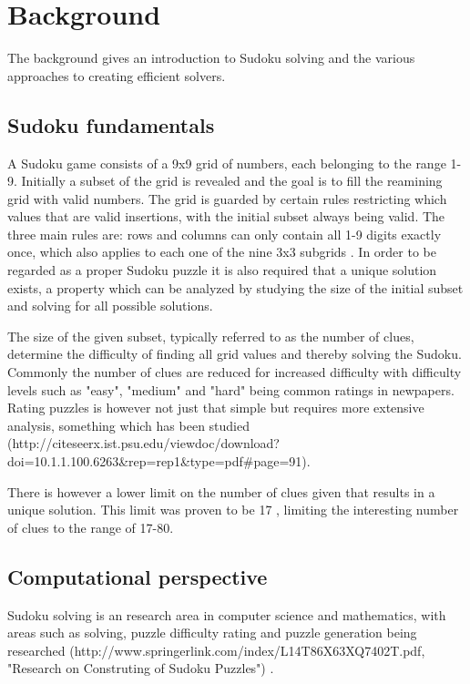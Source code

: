 \documentclass[a4paper,11pt]{kth-mag}
\begin{document}
\chapter{Background}
The background gives an introduction to Sudoku solving and the various approaches to creating efficient solvers.

\section{Sudoku fundamentals}
A Sudoku game consists of a 9x9 grid of numbers, each belonging to the range 1-9.
Initially a subset of the grid is revealed and the goal is to fill the reamining grid with valid numbers.
The grid is guarded by certain rules restricting which values that are valid insertions, with the initial subset always being valid.
The three main rules are: rows and columns can only contain all 1-9 digits exactly once, which also applies to each one of the nine 3x3 subgrids \cite{17clueProof}.
In order to be regarded as a proper Sudoku puzzle it is also required that a unique solution exists, a property which can be analyzed by studying the size of the initial subset and solving for all possible solutions.

The size of the given subset, typically referred to as the number of clues, determine the difficulty of finding all grid values and thereby solving the Sudoku.
Commonly the number of clues are reduced for increased difficulty with difficulty levels such as "easy", "medium" and "hard" being common ratings in newpapers.
Rating puzzles is however not just that simple but requires more extensive analysis, something which has been studied (http://citeseerx.ist.psu.edu/viewdoc/download?doi=10.1.1.100.6263\&rep=rep1\&type=pdf\#page=91).

There is however a lower limit on the number of clues given that results in a unique solution.
This limit was proven to be 17 \cite{17clueProof}, limiting the interesting number of clues to the range of 17-80.

\section{Computational perspective}
Sudoku solving is an research area in computer science and mathematics, with areas such as solving, puzzle difficulty rating and puzzle generation being researched \cite{stochastic}(http://www.springerlink.com/index/L14T86X63XQ7402T.pdf, "Research on Construting of Sudoku Puzzles") \cite{generation}.
\end{document}
